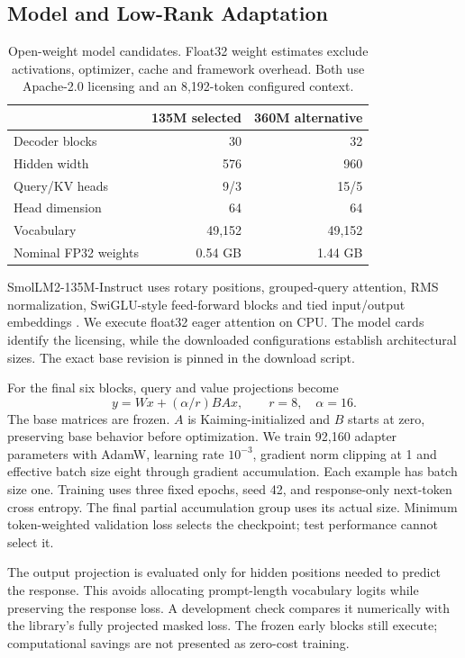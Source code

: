 \documentclass[conference]{IEEEtran}
\begin{document}
\subsection{Model and Low-Rank Adaptation}
\begin{table}[t]\centering\small
\caption{Open-weight model candidates. Float32 weight estimates exclude activations, optimizer, cache and framework overhead. Both use Apache-2.0 licensing and an 8,192-token configured context.}\label{tab:models}
\setlength{\tabcolsep}{4pt}\begin{tabular}{lrr}\toprule & 135M selected & 360M alternative\\\midrule
Decoder blocks & 30 & 32\\Hidden width & 576 & 960\\Query/KV heads & 9/3 & 15/5\\Head dimension & 64 & 64\\Vocabulary & 49,152 & 49,152\\Nominal FP32 weights & 0.54 GB & 1.44 GB\\\bottomrule\end{tabular}
\end{table}
SmolLM2-135M-Instruct uses rotary positions, grouped-query attention, RMS normalization, SwiGLU-style feed-forward blocks and tied input/output embeddings \cite{smol,config135,config360}. We execute float32 eager attention on CPU. The model cards identify the licensing, while the downloaded configurations establish architectural sizes. The exact base revision is pinned in the download script.

For the final six blocks, query and value projections become
\begin{equation} y = Wx + (\alpha/r) BAx, \qquad r=8,\quad\alpha=16. \end{equation}
The base matrices are frozen. $A$ is Kaiming-initialized and $B$ starts at zero, preserving base behavior before optimization. We train 92,160 adapter parameters with AdamW, learning rate $10^{-3}$, gradient norm clipping at 1 and effective batch size eight through gradient accumulation. Each example has batch size one. Training uses three fixed epochs, seed 42, and response-only next-token cross entropy. The final partial accumulation group uses its actual size. Minimum token-weighted validation loss selects the checkpoint; test performance cannot select it.

The output projection is evaluated only for hidden positions needed to predict the response. This avoids allocating prompt-length vocabulary logits while preserving the response loss. A development check compares it numerically with the library's fully projected masked loss. The frozen early blocks still execute; computational savings are not presented as zero-cost training.
\end{document}
